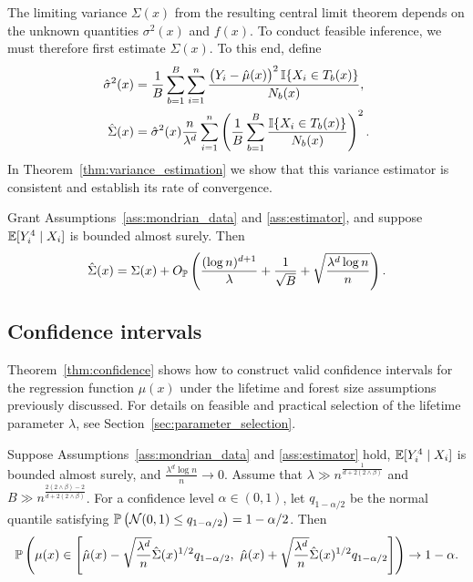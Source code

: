 The limiting variance $\Sigma(x)$ from the resulting central limit theorem
depends on the unknown quantities $\sigma^2(x)$ and $f(x)$.
To conduct feasible inference, we must therefore first estimate
$\Sigma(x)$. To this end, define
%
\begin{align}
  \label{eq:sigma2_hat}
  \hat\sigma^2(x)
  &=
  \frac{1}{B} \sum_{b=1}^{B} \sum_{i=1}^n
  \frac{\big(Y_i - \hat \mu(x)\big)^2 \, \I\{X_i \in T_b(x)\}} {N_b(x)}, \\
  \nonumber
  \hat\Sigma(x)
  &=
  \hat\sigma^2(x) \frac{n}{\lambda^d} \sum_{i=1}^n
  \left( \frac{1}{B} \sum_{b=1}^B \frac{\I\{X_i \in T_b(x)\}}{N_b(x)} \right)^2.
\end{align}
%
In Theorem~\ref{thm:variance_estimation} we show that this variance
estimator is consistent and establish its rate of convergence.
%
\begin{theorem}%
  \label{thm:variance_estimation}
  Grant Assumptions~\ref{ass:mondrian_data} and \ref{ass:estimator}, and
  suppose $\E[Y_i^4 \mid X_i ]$ is bounded almost surely. Then
  \begin{align*}
    \hat\Sigma(x)
    = \Sigma(x)
    + O_\P \left(
      \frac{(\log n)^{d+1}}{\lambda}
      + \frac{1}{\sqrt B} + \sqrt{\frac{\lambda^d \log n}{n}}
    \right).
  \end{align*}

\end{theorem}

\subsection{Confidence intervals}

Theorem~\ref{thm:confidence} shows how to construct valid confidence intervals
for the regression function $\mu(x)$ under the lifetime and forest size
assumptions previously discussed. For details on feasible and practical
selection of the lifetime parameter $\lambda$, see
Section~\ref{sec:parameter_selection}.
%
\begin{theorem}%
  \label{thm:confidence}
  Suppose Assumptions~\ref{ass:mondrian_data} and \ref{ass:estimator} hold,
  $\E[Y_i^4 \mid X_i ]$ is bounded almost surely,
  and $\frac{\lambda^d \log n}{n} \to 0$. Assume that
  $\lambda \gg n^{\frac{1}{d + 2(2 \wedge \beta)}}$
  and $B \gg n^{\frac{2 (2 \wedge \beta) - 2}{d + 2 (2 \wedge \beta)}}$.
  For a confidence level $\alpha \in (0, 1)$,
  let $q_{1 - \alpha / 2}$ be the normal quantile satisfying
  $\P \left( \cN(0, 1) \leq q_{1 - \alpha / 2} \right) = 1 - \alpha / 2$. Then
  \begin{align*}
    \P \left(
      \mu(x) \in
      \left[
        \hat \mu(x)
        - \sqrt{\frac{\lambda^d}{n}} \hat \Sigma(x)^{1/2}
        q_{1 - \alpha / 2}, \
        \hat \mu(x)
        + \sqrt{\frac{\lambda^d}{n}} \hat \Sigma(x)^{1/2}
        q_{1 - \alpha / 2}
      \right]
    \right)
    \to
    1 - \alpha.
  \end{align*}

\end{theorem}

